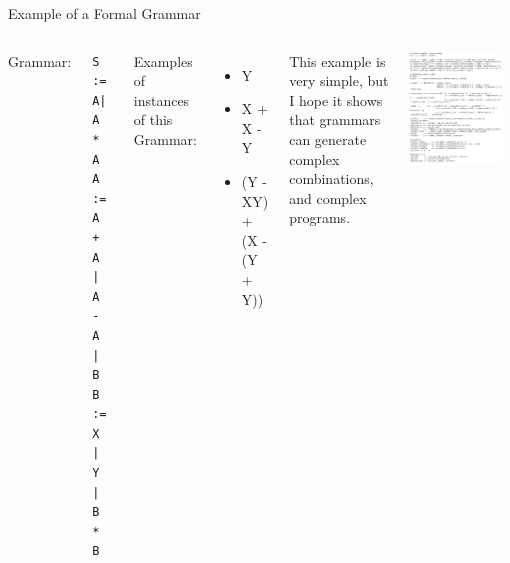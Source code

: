 \documentclass[aspectratio=169]{beamer}
\begin{document}
\begin{frame}[fragile]{Example of a Formal Grammar}
  \begin{columns}
    Grammar:
\begin{verbatim}
S := A| A * A
A := A + A | A - A | B
B := X | Y | B * B
\end{verbatim}

Examples of instances of this Grammar:
\begin{itemize}
 \item Y
 \item X + X - Y
 \item (Y - XY) + (X - (Y + Y))
\end{itemize}\bigskip

This example is very simple, but I hope it shows that grammars can
generate complex combinations, and complex programs.
    
    \includegraphics[width=0.9\textwidth]{img/GE_setup.png}
  \end{columns}
\end{frame}
\end{document}

